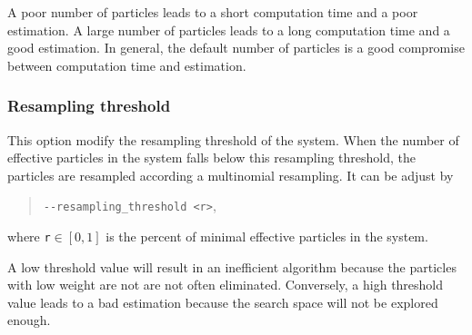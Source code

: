         A poor number of particles leads to a short computation time and a poor estimation. A large number of particles leads to a long computation time and a good estimation. In general, the default number of particles is a good compromise between computation time and estimation.


    \subsubsection*{Resampling threshold}
        This option modify the resampling threshold of the system. When the number of effective particles in the system falls below this resampling threshold, the particles are resampled according a multinomial resampling. It can be adjust by
            \begin{quote}
                \texttt{-\hspace{0.1mm}-resampling_threshold <r>},
            \end{quote}
        where \texttt{r}$\in[0,1]$ is the percent of minimal effective particles in the system.

        A low threshold value will result in an inefficient algorithm because the particles with low weight are not are not often eliminated. Conversely, a high threshold value leads to a bad estimation because the search space will not be explored enough.

